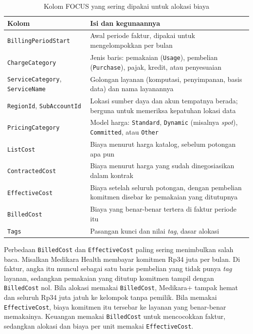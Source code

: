 \begin{table}[!htb]
  \centering
  \caption{Kolom FOCUS yang sering dipakai untuk alokasi biaya}
  \label{tab:ch03-kolom-focus}
  \footnotesize
  \begin{tabularx}{\textwidth}{>{\raggedright\arraybackslash}p{3.0cm} >{\raggedright\arraybackslash}X}
    \hline
    \textbf{Kolom} & \textbf{Isi dan kegunaannya} \\ \hline
    \texttt{BillingPeriodStart} & Awal periode faktur, dipakai untuk mengelompokkan per bulan \\
      \hline
    \texttt{ChargeCategory} & Jenis baris: pemakaian (\texttt{Usage}), pembelian
      (\texttt{Purchase}), pajak, kredit, atau penyesuaian \\ \hline
    \texttt{ServiceCategory}, \texttt{ServiceName} & Golongan layanan (komputasi, penyimpanan, basis
      data) dan nama layanannya \\ \hline
    \texttt{RegionId}, \texttt{SubAccountId} & Lokasi sumber daya dan akun tempatnya berada; berguna
      untuk memeriksa kepatuhan lokasi data \\ \hline
    \texttt{PricingCategory} & Model harga: \texttt{Standard}, \texttt{Dynamic} (misalnya
      \textit{spot}), \texttt{Committed}, atau \texttt{Other} \\ \hline
    \texttt{ListCost} & Biaya menurut harga katalog, sebelum potongan apa pun \\ \hline
    \texttt{ContractedCost} & Biaya menurut harga yang sudah dinegosiasikan dalam kontrak \\ \hline
    \texttt{EffectiveCost} & Biaya setelah seluruh potongan, dengan pembelian komitmen disebar ke
      pemakaian yang ditutupnya \\ \hline
    \texttt{BilledCost} & Biaya yang benar-benar tertera di faktur periode itu \\ \hline
    \texttt{Tags} & Pasangan kunci dan nilai \textit{tag}, dasar alokasi \\ \hline
  \end{tabularx}
\end{table}

Perbedaan \texttt{BilledCost} dan \texttt{EffectiveCost} paling sering menimbulkan salah baca.
Misalkan Medikara Health membayar komitmen Rp34 juta per bulan. Di faktur, angka itu muncul sebagai
satu baris pembelian yang tidak punya \textit{tag} layanan, sedangkan pemakaian yang ditutup
komitmen tampil dengan \texttt{BilledCost} nol. Bila alokasi memakai \texttt{BilledCost}, Medikara+
tampak hemat dan seluruh Rp34 juta jatuh ke kelompok tanpa pemilik. Bila memakai
\texttt{EffectiveCost}, biaya komitmen itu tersebar ke layanan yang benar-benar memakainya. Keuangan
memakai \texttt{BilledCost} untuk mencocokkan faktur, sedangkan alokasi dan biaya per unit memakai
\texttt{EffectiveCost}.

